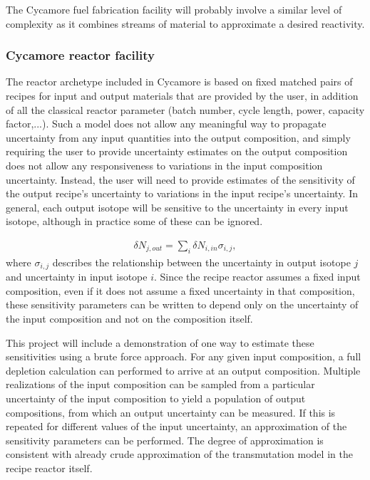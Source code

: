 \documentclass[dvips,12pt]{article}
\newcommand{\unc}[1]
{ \delta #1 }
\begin{document}
The Cycamore fuel fabrication facility will
probably involve a similar level of complexity as
it combines streams of material to approximate a
desired reactivity.

\subsubsection{Cycamore reactor facility}

The reactor archetype included in Cycamore is
based on fixed matched pairs of recipes for input
and output materials that are provided by the
user, in addition of all the classical reactor
parameter (batch number, cycle length, power,
capacity factor,...).  Such a model does not allow
any meaningful way to propagate uncertainty from
any input quantities into the output composition,
and simply requiring the user to provide uncertainty 
estimates on the output composition does not allow
any responsiveness to variations in the input
composition uncertainty.
Instead, the user will need to provide estimates
of the sensitivity of the output recipe's uncertainty to
variations in the input recipe's uncertainty.  In
general, each output isotope will be sensitive to
the uncertainty in every input isotope, although
in practice some of these can be ignored.

\begin{align}
\unc{N_{j,out}} = \sum_i \unc{N_{i,in}} \sigma_{i,j},
\end{align}
where $\sigma_{i,j}$ describes the relationship
between the uncertainty in output isotope $j$ and
uncertainty in input isotope $i$.  Since the
recipe reactor assumes a fixed input composition,
even if it does not assume a fixed uncertainty in
that composition, these sensitivity parameters can
be written to depend only on the uncertainty of
the input composition and not on the composition
itself.  

This project will include a demonstration of one
way to estimate these sensitivities using a brute
force approach.  For any given input composition,
a full depletion calculation can performed to
arrive at an output composition.  Multiple
realizations of the input composition can be
sampled from a particular uncertainty of the input
composition to yield a population of output
compositions, from which an output uncertainty can
be measured.  If this is repeated for different
values of the input uncertainty, an approximation
of the sensitivity parameters can be performed.
The degree of approximation is consistent with
already crude approximation of the transmutation
model in the recipe reactor itself.
\end{document}

